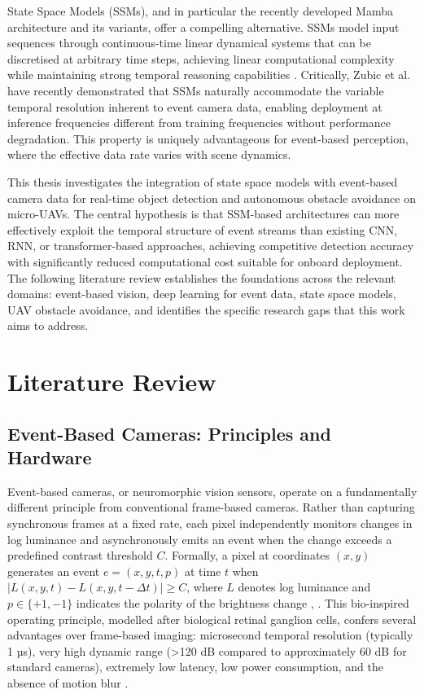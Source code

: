 \documentclass[11pt, a4paper]{report}
\begin{document}
State Space Models (SSMs), and in particular the recently developed Mamba architecture and its variants, offer a compelling alternative. SSMs model input sequences through continuous-time linear dynamical systems that can be discretised at arbitrary time steps, achieving linear computational complexity while maintaining strong temporal reasoning capabilities \cite{gu2022efficiently}. Critically, Zubic et al. \cite{zubic2024state} have recently demonstrated that SSMs naturally accommodate the variable temporal resolution inherent to event camera data, enabling deployment at inference frequencies different from training frequencies without performance degradation. This property is uniquely advantageous for event-based perception, where the effective data rate varies with scene dynamics. 

This thesis investigates the integration of state space models with event-based camera data for real-time object detection and autonomous obstacle avoidance on micro-UAVs. The central hypothesis is that SSM-based architectures can more effectively exploit the temporal structure of event streams than existing CNN, RNN, or transformer-based approaches, achieving competitive detection accuracy with significantly reduced computational cost suitable for onboard deployment. The following literature review establishes the foundations across the relevant domains: event-based vision, deep learning for event data, state space models, UAV obstacle avoidance, and identifies the specific research gaps that this work aims to address. 

\chapter{Literature Review}

\section{Event-Based Cameras: Principles and Hardware}
Event-based cameras, or neuromorphic vision sensors, operate on a fundamentally different principle from conventional frame-based cameras. Rather than capturing synchronous frames at a fixed rate, each pixel independently monitors changes in log luminance and asynchronously emits an event when the change exceeds a predefined contrast threshold $C$. Formally, a pixel at coordinates $(x, y)$ generates an event $e = (x, y, t, p)$ at time $t$ when $|L(x, y, t) - L(x, y, t - \Delta t)| \geq C$, where $L$ denotes log luminance and $p \in \{+1, -1\}$ indicates the polarity of the brightness change \cite{gallego2020event}, \cite{lichtsteiner2008128x128}. This bio-inspired operating principle, modelled after biological retinal ganglion cells, confers several advantages over frame-based imaging: microsecond temporal resolution (typically 1 µs), very high dynamic range (>120 dB compared to approximately 60 dB for standard cameras), extremely low latency, low power consumption, and the absence of motion blur \cite{gallego2020event}.
\end{document}
